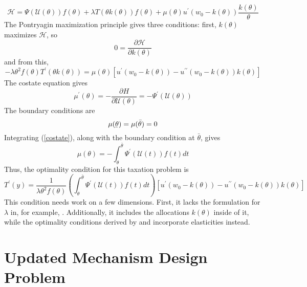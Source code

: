 \documentclass[11pt]{article}
\newcommand{\ubar}[1]{\underaccent{\bar}{#1}}
\newcommand{\p}{\prime}
\newcommand{\U}{\mathcal{U}}
\newcommand{\pderiv}[2]{\frac{\partial#1}{\partial #2}}
\begin{document}
\begin{equation}
    \mathcal{H} = \Psi\left( \U(\theta) \right) f(\theta) + \lambda T (\theta k(\theta)) f(\theta) + \mu(\theta) u^\p(w_0 - k(\theta))\frac{k(\theta)}{\theta} 
\end{equation}
% 
The Pontryagin maximization principle gives three conditions: first, \( k(\theta) \) maximizes \( \mathcal{H} \), so 
\begin{equation*}
    0 = \pderiv{\mathcal{H}}{k(\theta)}
\end{equation*}
and from this,
\begin{equation}
    -\lambda\theta^2 f(\theta)T^\p(\theta k(\theta)) = \mu(\theta)\left[ u^\p(w_0 - k(\theta)) - u^{\p\p}(w_0 - k(\theta))k(\theta) \right]
\end{equation}
The costate equation gives 
\begin{equation}
    \mu^\p(\theta) = -\pderiv{H}{\U(\theta)} = - \Psi^\p(\U(\theta))\label{costate}
\end{equation}
The boundary conditions are
\[\mu(\ubar{\theta}) = \mu(\bar{\theta}) = 0\]
Integrating (\ref{costate}), along with the boundary condition at \( \bar{\theta} \), gives 
\begin{equation}
    \mu(\theta) = -\int_{\theta}^{\bar{\theta}} \Psi^\p \left( \U(t) \right)f(t)dt 
\end{equation}
Thus, the optimality condition for this taxation problem is 
\begin{equation}
    T^\p(y) = \frac{1}{\lambda\theta^2 f(\theta)} \left( \int_{\theta}^{\bar{\theta}} \Psi^\p \left( \U(t) \right)f(t)dt\right) \left[ u^\p(w_0 - k(\theta)) - u^{\p\p}(w_0 - k(\theta))k(\theta) \right]
\end{equation}
This condition needs work on a few dimensions. First, it lacks the formulation for \( \lambda \) in, for example, \cite{diamond1998optimal}. Additionally, it includes the allocations \( k(\theta) \) inside of it, while the optimality conditions derived by \cite{diamond1998optimal} and \cite{salanie2011economics} incorporate elasticities instead. 

\section{Updated Mechanism Design Problem }\label{s2}
\end{document}
